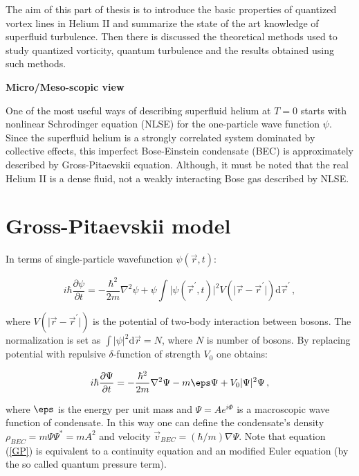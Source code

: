 The aim of this part of thesis is to introduce the basic properties of quantized vortex lines in Helium II and summarize the state of the art knowledge of superfluid turbulence. Then there is discussed the theoretical methods used to study quantized vorticity, quantum turbulence and the results obtained using such methods.



\newpage

{\Huge \bfseries Micro/Meso-scopic view}
\vspace{0.3cm}

One of the most useful ways of describing superfluid helium at $T=0$ starts with nonlinear Schrodinger equation (NLSE) for the one-particle wave function $\psi$. Since the superfluid helium is a strongly correlated system dominated by collective effects, this imperfect Bose-Einstein condensate (BEC) is approximately described by Gross-Pitaevskii equation. Although, it must be noted that the real Helium II is a dense fluid, not a weakly interacting Bose gas described by NLSE.

\section{Gross-Pitaevskii model}

In terms of single-particle wavefunction $\psi(\vec{r},t)$:

\begin{equation}
i \hbar \frac{\partial \psi}{\partial t} = - \frac{\hbar^2}{2m} \nabla^2 \psi
+ \psi \int \vert \psi(\vec{r}^{\prime},t) \vert^2 V(\vert \vec{r} - \vec{r}^{\prime} \vert)
\text{d}\vec{r}^{\prime}\,,
\end{equation}

where $V(\vert \vec{r} - \vec{r}^{\prime} \vert)$ is the potential of two-body interaction between bosons. The normalization is set as $\int \vert \psi \vert^2 \text{d}\vec{r} = N$, where $N$ is number of bosons. By replacing potential with repulsive $\delta$-function of strength $V_0$ one obtains:

\begin{equation}
i \hbar \frac{\partial \Psi}{\partial t} = - \frac{\hbar^2}{2m} \nabla^2 \Psi - m\eps \Psi + V_0 \vert \Psi \vert^2 \Psi\,,
\label{GP}
\end{equation}

where $\eps$ is the energy per unit mass and $\Psi = A e^{i\Phi}$ is a macroscopic wave function of condensate. In this way one can define the condensate's density $\rho_{BEC} = m\Psi\Psi^* =  mA^2$ and velocity $\vec{v}_{BEC} = (\hbar / m)\nabla \Psi$. Note that equation (\ref{GP}) is equivalent to a continuity equation and an modified Euler equation (by the so called quantum pressure term).

